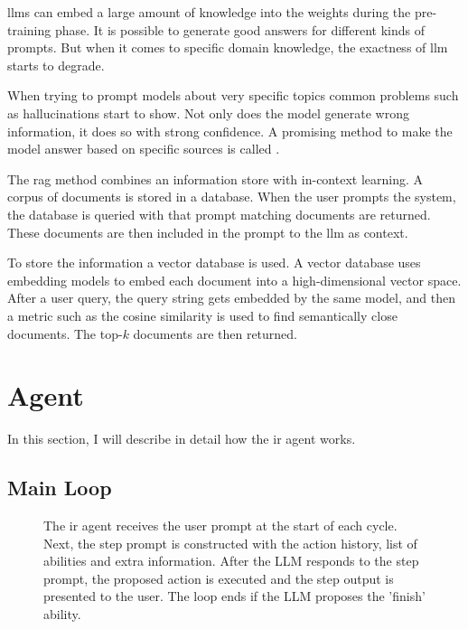 \documentclass[../main.tex]{subfiles}
\begin{document}
\Glspl{llm} can embed a large amount of knowledge into the weights during the pre-training phase.
It is possible to generate good answers for different kinds of prompts.
But when it comes to specific domain knowledge, the exactness of \gls{llm} starts to degrade.

When trying to prompt models about very specific topics common problems such as hallucinations start to show.
Not only does the model generate wrong information, it does so with strong confidence.
A promising method to make the model answer based on specific sources is called .

The \gls{rag} method combines an information store with in-context learning.
A corpus of documents is stored in a database.
When the user prompts the system, the database is queried with that prompt matching documents are returned.
These documents are then included in the prompt to the \gls{llm} as context.

To store the information a vector database is used.
A vector database uses embedding models to embed each document into a high-dimensional vector space.
After a user query, the query string gets embedded by the same model,
and then a metric such as the cosine similarity is used to find semantically close documents.
The top-$k$ documents are then returned.

\section{Agent}

In this section, I will describe in detail how the \gls{ir} agent works.

\subsection{Main Loop}

\begin{figure}[t]
    \centering
    \caption{The \gls{ir} agent receives the user prompt at the start of each cycle.
        Next, the step prompt is constructed with the action history, list of abilities and extra information.
        After the LLM responds to the step prompt, the proposed action is executed
        and the step output is presented to the user.
        The loop ends if the LLM proposes the 'finish' ability.}
    \label{fig:agent_loop}
\end{figure}
\end{document}

